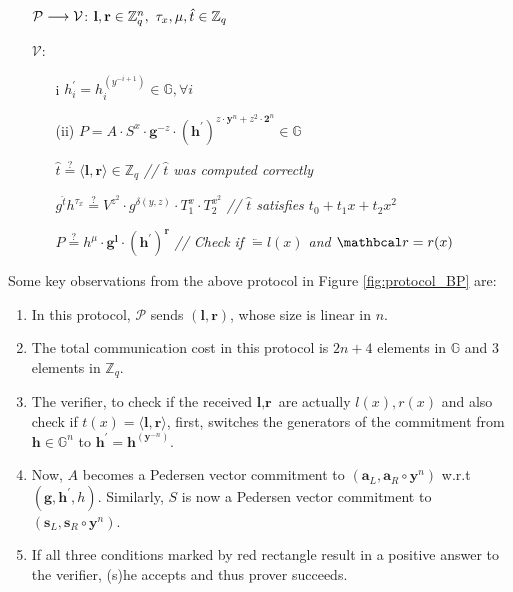 \begin{mdframed}
\begin{itemize}[itemsep=4pt]
    \item[] $\mathcal{P} \longrightarrow \mathcal{V}$: $ \textbf{l},\textbf{r} \in \mathbb{Z}_q^n, \ \tau_x, \mu, \hat{t} \in \mathbb{Z}_q$
    
    \item[] $\mathcal{V}$: 
    \begin{enumerate}[itemsep=5pt]
        \item[i] $h^{\prime}_i = h_i^{(y^{-i+1})} \in \mathbb{G}, \forall i$
        \item[(ii)] $P = A\cdot S^x \cdot \textbf{g}^{-z} \cdot
        (\textbf{h}^{\prime})^{z\cdot \textbf{y}^n + z^2 \cdot \textbf{2}^n} \in \mathbb{G}$
          
        $\hat{t} \stackrel{?}{=}
        \langle \textbf{l},\textbf{r}\rangle \in \mathbb{Z}_q$
        \hfill{{\small \textit{// $\hat{t}$ was computed correctly}}}

        $ g^{\hat{t}}
        h^{\tau_x} 
        \stackrel{?}{=}
        V^{z^2} 
        \cdot
        g^{\delta(y,z)} 
        \cdot 
        T_1^{x} 
        \cdot 
        T_2^{x^2}$
        \hfill{{\small \textit{// $\hat{t}$ satisfies $t_0 + t_1x + t_2x^2$}}} 

        $P \stackrel{?}{=}
        h^{\mu} \cdot \textbf{g}^{\textbf{l}} \cdot (\textbf{h}^{\prime})^{\textbf{r}}$
        \hfill{{\small \textit{// Check if $\lvec = l(x)$ and $\rvec = r(x)$}}}
        
    \end{enumerate}
\end{itemize}
\end{mdframed}
Some key observations from the above protocol in Figure \ref{fig:protocol_BP} are:
\begin{enumerate}
    \item In this protocol, $\mathcal{P}$ sends $(\textbf{l}, \textbf{r})$, whose size is linear in $n$.
    \item The total communication cost in this protocol is $2n+4$ elements in $\mathbb{G}$ and $3$ elements in $\mathbb{Z}_q$.
    \item The verifier, to check if the received $\textbf{l}, \textbf{r}$ are actually $l(x), r(x)$ and also check if $t(x)=\langle \textbf{l}, \textbf{r}\rangle$, first, switches the generators of the commitment from $\textbf{h} \in \mathbb{G}^n$ to $\textbf{h}^{\prime} = \textbf{h}^{(\textbf{y}^{-n})}$.   
    \item Now, $A$ becomes a Pedersen vector commitment to $(\textbf{a}_L, \textbf{a}_R \circ \textbf{y}^n)$ w.r.t $(\textbf{g}, \textbf{h}^{\prime}, h)$. Similarly, $S$ is now a Pedersen vector commitment to $(\textbf{s}_L, \textbf{s}_R \circ \textbf{y}^n)$.
    \item If all three conditions marked by red rectangle result in a positive answer to the verifier, (s)he accepts and thus prover succeeds.
\end{enumerate}


